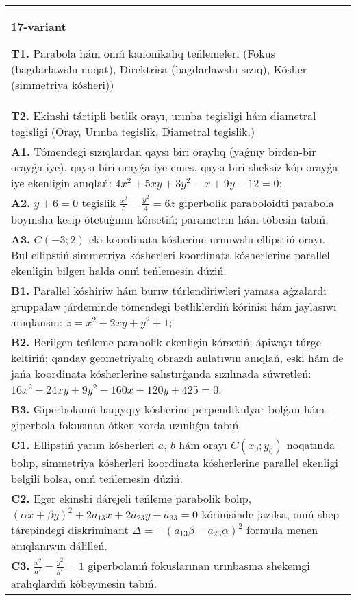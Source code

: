 \documentclass{article}
\begin{document}
\begin{tabular}{m{17cm}}
\textbf{17-variant}
\newline

\textbf{T1.} Parabola hám onıń kanonikalıq teńlemeleri (Fokus (bagdarlawshı noqat), Direktrisa (bagdarlawshı sızıq), Kósher (simmetriya kósheri)) \\
\textbf{T2.} Ekinshi tártipli betlik orayı, urınba tegisligi hám diametral tegisligi (Oray, Urınba tegislik, Diametral tegislik.) \\
\textbf{A1.} Tómendegi sızıqlardan qaysı biri oraylıq (yaǵnıy birden-bir orayǵa iye), qaysı biri orayǵa iye emes, qaysı biri sheksiz kóp orayǵa iye ekenligin anıqlań: $4 x^2+5 x y+3 y^2-x+9 y-12=0$; \\
\textbf{A2.} $y+6=0$ tegislik $\frac{x^2}{5}-\frac{y^2}{4}=6 z$ giperbolik paraboloidti parabola boyınsha kesip ótetuģının kórsetiń; parametrin hám tóbesin tabıń. \\
\textbf{A3.} $C (-3; 2)$ eki koordinata kósherine urınıwshı ellipstiń orayı. Bul ellipstiń simmetriya kósherleri koordinata kósherlerine parallel ekenligin bilgen halda onıń teńlemesin dúziń. \\
\textbf{B1.} Parallel kóshiriw hám burıw túrlendiriwleri yamasa aǵzalardı gruppalaw járdeminde tómendegi betliklerdiń kórinisi hám jaylasıwı anıqlansın: $z=x^2+2 x y+y^2+1$; \\
\textbf{B2.} Berilgen teńleme parabolik ekenligin kórsetiń; ápiwayı túrge keltiriń; qanday geometriyalıq obrazdı anlatıwın anıqlań, eski hám de jańa koordinata kósherlerine salıstırģanda sızılmada súwretleń:$16 x^2-24 x y+9 y^2-160 x+120 y+425=0$. \\
\textbf{B3.} Giperbolanıń haqıyqıy kósherine perpendikulyar bolǵan hám giperbola fokusınan ótken xorda uzınlıǵın tabıń. \\
\textbf{C1.} Ellipstiń yarım kósherleri $a$, $b$ hám orayı $C\left(x_0; y_0\right) $ noqatında bolıp, simmetriya kósherleri koordinata kósherlerine parallel ekenligi belgili bolsa, onıń teńlemesin dúziń. \\
\textbf{C2.} Eger ekinshi dárejeli teńleme parabolik bolıp, $ (\alpha x+\beta y) ^2+2a_{13}x+2a_{23}y+a_{33}=0$ kórinisinde jazılsa, onıń shep tárepindegi diskriminant $\Delta=- (a_{13} \beta-a_{23} \alpha) ^2$ formula menen anıqlanıwın dálilleń. \\
\textbf{C3.} $\frac{x^2}{a^2}-\frac{y^2}{b^2}=1$ giperbolanıń fokuslarınan urınbasına shekemgi aralıqlardıń kóbeymesin tabıń. \\

\end{tabular}
\vspace{1cm}
\end{document}
